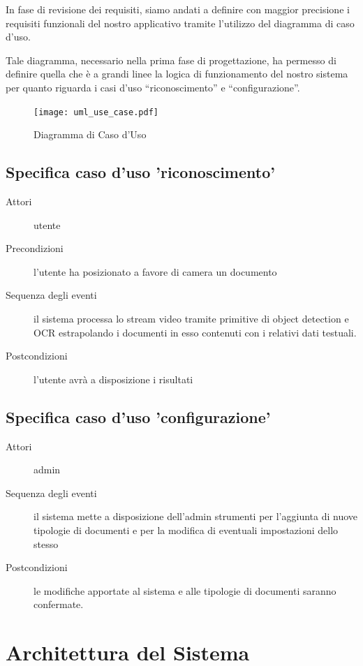 \documentclass[12pt,a4paper]{article}
\begin{document}
In fase di revisione dei requisiti, siamo andati a definire con maggior
precisione i requisiti funzionali del nostro applicativo tramite
l'utilizzo del diagramma di caso d'uso.

Tale diagramma, necessario nella prima fase di progettazione, ha
permesso di definire quella che è a grandi linee la logica di
funzionamento del nostro
sistema per quanto riguarda i casi d'uso ``riconoscimento'' e ``configurazione''.

\begin{figure}[H]
    \caption{Diagramma di Caso d'Uso}
    \centering
    \texttt{[image: uml\_use\_case.pdf]}
\end{figure}

\subsection{Specifica caso d'uso 'riconoscimento'}
\begin{description}
    \item[Attori] utente
    \item[Precondizioni] l'utente ha posizionato a favore di camera un documento
    \item[Sequenza degli eventi] il sistema processa lo stream video tramite primitive di object detection e OCR estrapolando i documenti in esso contenuti con i relativi dati testuali.
    \item[Postcondizioni] l'utente avrà a disposizione i risultati
\end{description}

\subsection{Specifica caso d'uso 'configurazione'}
\begin{description}
    \item[Attori] admin
    \item[Sequenza degli eventi] il sistema mette a disposizione dell'admin strumenti per l'aggiunta di nuove tipologie di documenti e per la modifica di eventuali impostazioni dello stesso
    \item[Postcondizioni] le modifiche apportate al sistema e alle tipologie di documenti saranno confermate.
\end{description}


\section{Architettura del Sistema}
\end{document}
